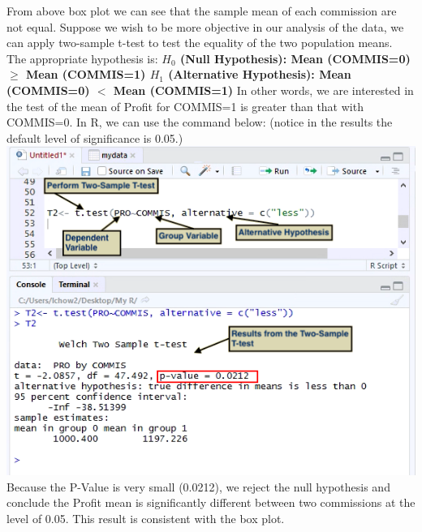 \documentclass[a4paper]{report}
\begin{document}
        \begin{flushleft}
        From above box plot we can see that the sample mean of each commission are not equal. Suppose we wish to be more objective in our analysis of the data, we can apply two-sample t-test to test the equality of the two population means. The appropriate hypothesis is: 
        \newline \newline
        \textbf{ $H_{0}$ (Null Hypothesis): \hspace{0.4in} Mean (COMMIS=0) $\geq$ Mean (COMMIS=1) \newline
        $H_{1}$ (Alternative Hypothesis): Mean (COMMIS=0) $<$ Mean (COMMIS=1)	}	
        \newpage
        In other words, we are interested in the test of the mean of Profit for COMMIS=1 is greater than that with COMMIS=0. In R, we can use the command below:
        (notice in the results the default level of significance is 0.05.)
        \newline\newline
         \includegraphics[width=\textwidth]{images/TTEST2.png}
         \newline \newline
         Because the P-Value is very small (0.0212), we reject the null hypothesis and conclude the Profit mean is significantly different between two commissions at the level of 0.05. This result is consistent with the box plot. 
        \end{flushleft}
        
        \newpage
\end{document}
